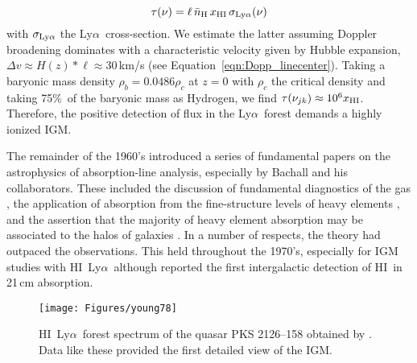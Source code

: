 \documentclass[graybox]{svmult}
\newcommand{\HI}{H{\sc I}}
\def\lya{Ly$\alpha$}
\def\mlya{{\rm Ly}\alpha}
\begin{document}
\begin{equation}
\tau(\nu) = \ell \, \bar n_{\rm H} \, x_{\rm HI} \, \sigma_{\mlya}(\nu)
\end{equation}
with $\sigma_{\mlya}$ the \lya\ cross-section.
We estimate the latter assuming Doppler broadening dominates
with a characteristic velocity given by Hubble expansion,
$\Delta v \approx H(z) * \ell \approx 30$\,km/s 
(see Equation~\ref{eqn:Dopp_linecenter}).
Taking a baryonic mass density $\rho_b = 0.0486 \rho_c$
at $z=0$ with $\rho_c$ the critical density and
taking 75\%\ of the baryonic mass as Hydrogen,
we find $\tau(\nu_{jk}) \approx 10^6 x_{\rm HI}$.
Therefore, the positive detection of flux in the 
\lya\ forest demands a highly ionized IGM.

The remainder of the 1960's introduced a series of 
fundamental papers on the astrophysics of absorption-line
analysis, especially by Bachall and his collaborators.
These included the discussion of fundamental diagnostics
of the gas \cite{bahcall66}, 
the application of absorption from the fine-structure 
levels of heavy elements \cite{bahcall67}, and the
assertion that the majority of heavy element absorption
may be associated to the halos of galaxies
\cite{bahcall69a,bahcall69b}.
In a number of respects, the theory had outpaced the
observations.
This held throughout the 1970's, especially for IGM
studies with \HI\ \lya\ although \cite{brown73}
reported the first intergalactic detection of 
\HI\ in 21\,cm absorption.

%
\begin{figure}[b]
\sidecaption
\texttt{[image: Figures/young78]}
%
%
\caption{\HI\ \lya\ forest spectrum of the quasar PKS 2126--158
obtained by \cite{young78}.  Data like these provided the first
detailed view of the IGM.
}
\label{fig:young}       %
\end{figure}
\end{document}
